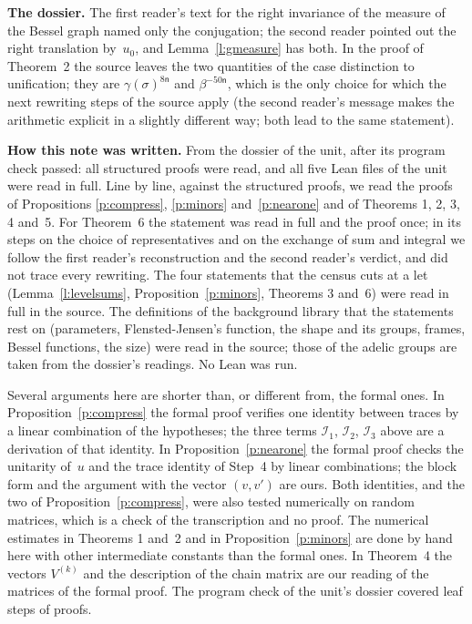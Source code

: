 \documentclass[11pt,a4paper]{article}
\newcommand{\leanfont}{\ttfamily\fontsize{8.6}{10.5}\selectfont\color{leancol}}
\newcommand{\m}[1]{\mbox{$#1$}}        %
\newcommand{\subhead}[1]{\par\addvspace{9pt plus 2pt}\Needspace{4\baselineskip}\noindent\textbf{#1}\enspace\ignorespaces}
\theoremstyle{plainx}
\theoremstyle{uprightx}
\newcommand{\lf}[1]{{\leanfont #1}}
\begin{document}
\subhead{The dossier.} The first reader's text for the right invariance of the measure of the Bessel graph named
only the conjugation; the second reader pointed out the right translation by~$u_0$, and Lemma~\ref{l:gmeasure} has
both. In the proof of Theorem~2 the source leaves the two quantities of the case distinction to unification;
they are \m{\gamma(\sigma)^{8\mathsf{n}}} and \m{\beta^{-50\mathsf{n}}}, which is the only choice for which the next rewriting
steps of the source apply (the second reader's message makes the arithmetic explicit in a slightly different
way; both lead to the same statement).

\subhead{How this note was written.} From the dossier of the unit, after its program check passed: all
\UnitProofs{} structured proofs were read, and all five Lean files of the unit were read in full.
Line by line, against the structured proofs, we read the proofs of Propositions \ref{p:compress}, \ref{p:minors}
and~\ref{p:nearone} and of Theorems 1, 2, 3, 4 and~5. For Theorem~6 the statement was read in full and the proof
once; in its steps on the choice of representatives and on the exchange of sum and integral we follow the first
reader's reconstruction and the second reader's verdict, and did not trace every rewriting. The four statements
that the census cuts at a \lf{let} (Lemma~\ref{l:levelsums}, Proposition~\ref{p:minors}, Theorems 3 and~6) were read
in full in the source. The definitions of the background library that the statements rest on (parameters,
Flensted-Jensen's function, the shape and its groups, frames, Bessel functions, the size) were read in the
source; those of the adelic groups are taken from the dossier's readings. No Lean was run.

Several arguments here are shorter than, or different from, the formal ones. In Proposition~\ref{p:compress} the
formal proof verifies one identity between traces by a linear combination of the hypotheses; the three terms
$\mathcal{I}_1$, $\mathcal{I}_2$, $\mathcal{I}_3$ above are a derivation of that identity. In
Proposition~\ref{p:nearone} the formal proof checks the unitarity of~$u$ and the trace identity of Step~4 by linear
combinations; the block form and the argument with the vector \m{(v,v')} are ours. Both identities, and the two
of Proposition~\ref{p:compress}, were also tested numerically on random matrices, which is a check of the
transcription and no proof. The numerical estimates in Theorems 1 and~2 and in Proposition~\ref{p:minors} are done
by hand here with other intermediate constants than the formal ones. In Theorem~4 the vectors $V^{(k)}$ and the
description of the chain matrix are our reading of the matrices of the formal proof. The program check of the
unit's dossier covered \UnitSteps{} leaf steps of \UnitProofs{} proofs.
\end{document}
